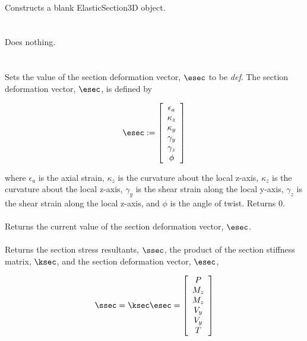 \\
Constructs a blank ElasticSection3D object. \\

 \\
 \\ 
Does nothing. \\

 \\
  \\
Sets the value of the section deformation vector, $\esec$ to be {\em
def}. The section deformation vector, $\esec$, is defined by

\begin{equation}
\esec := \left[
   \begin{array}{c}
       \epsilon_a \\
       \kappa_z   \\
       \kappa_y   \\
       \gamma_y   \\
       \gamma_z   \\
       \phi
   \end{array} 
 \right]
\end{equation}

where $\epsilon_a$ is the axial strain, $\kappa_z$ is the curvature about
the local z-axis, $\kappa_z$ is the curvature about the local z-axis, 
$\gamma_y$ is the shear strain along the local y-axis, $\gamma_z$
is the shear strain along the local z-axis, and $\phi$ is the angle of
twist. Returns $0$. \\

 \\
Returns the current value of the section deformation vector, $\esec$. \\

 \\
Returns the section stress resultants, $\ssec$, the product of the 
section stiffness matrix, $\ksec$, and the section deformation 
vector, $\esec$,

\begin{equation}
\ssec = \ksec \esec = \left[
   \begin{array}{c}
       P     \\
       M_z   \\
       M_z   \\
       V_y   \\
       V_y   \\
       T
   \end{array} 
 \right]
\end{equation}

